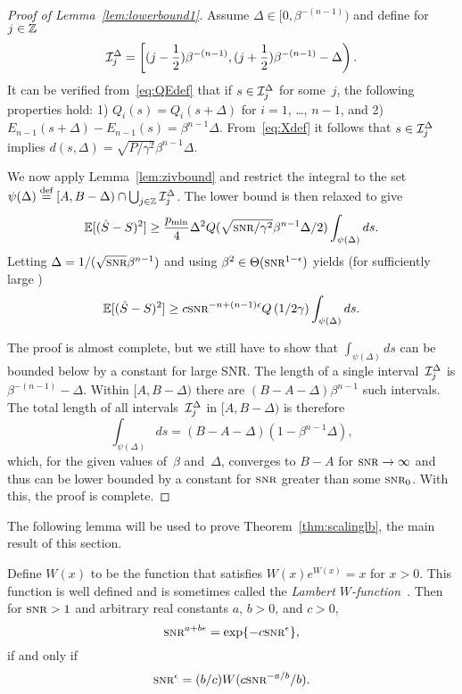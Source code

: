 \begin{proof}[Proof of Lemma~\ref{lem:lowerbound1}]
  Assume $\Delta \in [0, \beta^{-(n-1)})$ and define for $j \in \mathbb{Z}$
  \[ \mathcal{I}_j^\Delta = \left[ (j - \frac12 )\beta^{-(n-1)}, 
    (j + \frac12 ) \beta^{-(n-1)} - \Delta \right).\]
  It can be verified from~\eqref{eq:QEdef} that if $s \in \mathcal{I}_j^\Delta$ for
  some~$j$, the following properties hold: 1) $Q_i(s) = Q_i(s+\Delta)$ for
  $i=1$, \dots, $n-1$, and 2) $E_{n-1}(s+\Delta) - E_{n-1}(s) =
  \beta^{n-1}\Delta$.  From~\eqref{eq:Xdef} it follows that
  $s \in \mathcal{I}_j^\Delta$ implies $d(s, \Delta) = \sqrt{P/\gamma^2} \beta^{n-1}\Delta$.

  We now apply Lemma~\ref{lem:zivbound} and restrict the integral to the
  set~$\psi(\Delta) \stackrel{\text{def}}{=} [A,B-\Delta) \cap \bigcup_{j\in\mathbb{Z}} \mathcal{I}_j^\Delta$. The
  lower bound is then relaxed to give
  \begin{equation*}
    \mse \ge \frac{\pmin}{4} \Delta^2 Q(\sqrt{\snr/\gamma^2} \beta^{n-1}
    \Delta/2) \int_{\psi(\Delta)} ds.
  \end{equation*}
  Letting $\Delta = 1/(\sqrt{\snr}\beta^{n-1})$ and using $\beta^2 \in
  \Theta(\snr^{1-\e})$ yields (for sufficiently large \snr)
  \begin{equation*}
    \mse \ge c \snr^{-n+(n-1)\e} Q\left(1/2\gamma\right)
    \int_{\psi(\Delta)} ds.
  \end{equation*}

  The proof is almost complete, but we still have to show that
  $\int_{\psi(\Delta)}ds$ can be bounded below by a constant for large SNR. The
  length of a single interval~$\mathcal{I}_j^\Delta$ is $\beta^{-(n-1)} - \Delta$. Within
  $[A,B-\Delta)$ there are $(B-A-\Delta)\beta^{n-1}$ such
  intervals. The total length of all intervals~$\mathcal{I}_j^\Delta$ in $[A, B-\Delta)$
  is therefore
  \[ \int_{\psi(\Delta)} ds = (B-A-\Delta)
  (1 - \beta^{n-1}\Delta), \]
  which, for the given values of~$\beta$ and~$\Delta$, 
  converges to $B-A$ for $\snr \ra \infty$ and thus can be lower bounded by a
  constant for $\snr$ greater than some $\snr_0$. With this, the proof is
  complete.
\end{proof}

The following lemma will be used to prove Theorem~\ref{thm:scalinglb}, the main
result of this section.

\begin{lemma}
  \label{lem:epssolution}
  Define $W(x)$ to be the function that satisfies $W(x)e^{W(x)} = x$ for $x >
  0$.  This function is well defined and is sometimes called the \emph{Lambert
  $W$-function}~\textnormal{\cite{CorlessGHJK1996}}. Then for $\snr > 1$ and
  arbitrary real constants $a$, $b>0$, and $c > 0$, 
  \begin{equation}
    \label{eq:epsequation}
    \snr^{a+b\e} = \exp\{-c\snr^\e\},
  \end{equation}
  if and only if
  \begin{equation}
    \label{eq:epssolution}
    \snr^\e = (b/c) W(c\snr^{-a/b} / b).
  \end{equation}
\end{lemma}

